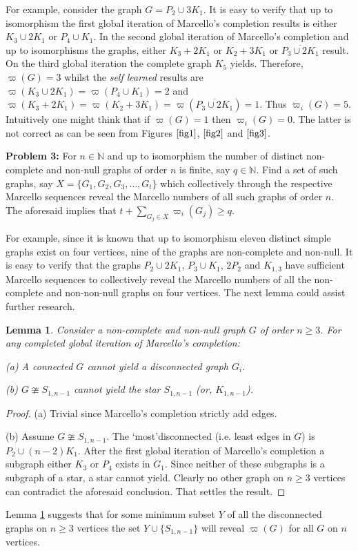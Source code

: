 \documentclass[12pt]{amsart}
\numberwithin{equation}{section}
\newtheorem{lemma}[theorem]{Lemma}
\numberwithin{equation}{section}
\begin{document}
For example, consider the graph $G = P_2 \cup 3K_1$. It is easy to verify that up to isomorphism the first global iteration of Marcello's completion results is either $K_3 \cup 2K_1$ or $P_4 \cup K_1$. In the second global iteration of Marcello's completion and up to isomorphisms the graphs, either $K_3 + 2K_1$ or $K_2 + 3K_1$ or $\overline{P_3 \cup 2K_1}$ result. On the third global iteration the complete graph $K_5$ yields. Therefore, $\varpi(G) = 3$ whilst the \emph{self learned} results are $\varpi(K_3 \cup 2K_1) = \varpi(P_4 \cup K_1) = 2$ and $\varpi(K_3 + 2K_1) = \varpi(K_2 + 3K_1) = \varpi(\overline{P_3 \cup 2K_1}) = 1$. Thus $\varpi_i(G) = 5$. Intuitively one might think that if $\varpi(G) = 1$ then $\varpi_i(G) = 0$. The latter is not correct as can be seen from Figures $\ref{fig1}$, $\ref{fig2}$ and $\ref{fig3}$. 

\textbf{Problem 3:} For $n \in \mathbb{N}$ and up to isomorphism the number of distinct non-complete and non-null graphs of order $n$ is finite, say $q \in \mathbb{N}$. Find a set of such graphs, say $X = \{G_1, G_2, G_3,\dots, G_t\}$ which collectively through the respective Marcello sequences reveal the Marcello numbers of all such graphs of order $n$. The aforesaid implies that $t + \sum\limits_{G_j \in X}\varpi_i(G_j) \geq q$.

For example, since it is known that up to isomorphism eleven distinct simple graphs exist on four vertices, nine of the graphs are non-complete and non-null. It is easy to verify that the graphs $P_2 \cup 2K_1$, $P_3 \cup K_1$, $2P_2$ and $K_{1,3}$ have sufficient Marcello sequences to collectively reveal the Marcello numbers of all the non-complete and non-non-null graphs on four vertices. The next lemma could assist further research.
\begin{lemma}\label{lem3}
Consider a non-complete and non-null graph $G$ of order $n \geq 3$. For any completed global iteration of Marcello's completion:

(a) A connected $G$ cannot yield a disconnected graph $G_i$.

(b) $G \ncong S_{1,n-1}$ cannot yield the star $S_{1,n-1}$ (or, $K_{1,n-1}$).
\end{lemma}
\begin{proof}
(a) Trivial since Marcello's completion strictly add edges.

(b) Assume $G \ncong S_{1,n-1}$. The \lq most\rq  disconnected (i.e. least edges in $G$) is $P_2 \cup (n-2)K_1$. After the first global iteration of Marcello's completion a subgraph either $K_3$ or $P_4$ exists in $G_1$. Since neither of these subgraphs is a subgraph of a star, a star cannot yield. Clearly no other graph on $n \geq 3$ vertices can contradict the aforesaid conclusion. That settles the result.
\end{proof}
Lemma \ref{lem3} suggests that for some minimum subset $Y$ of all the disconnected graphs on $n \geq 3$ vertices the set $Y \cup \{S_{1,n-1}\}$ will reveal $\varpi(G)$ for all $G$ on $n$ vertices. 
\end{document}
